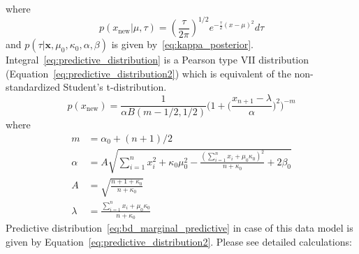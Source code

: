 where
\begin{equation}
p(x_{\text{new}} | \mu, \tau) = (\frac{\tau}{2 \pi})^{1/2} e^{-\frac{\tau}{2} (x-\mu)^2} d \tau
\end{equation}
and $p(\tau | \pmb{x}, \mu_0, \kappa_0, \alpha, \beta)$ is given by~\ref{eq:kappa_posterior}.
Integral~\ref{eq:predictive_distribution} is a Pearson type VII distribution (Equation~\ref{eq:predictive_distribution2}) which is
equivalent of the non-standardized Student's t-distribution.
\begin{equation}
p(x_{\text{new}})=\frac{1}{\alpha B(m - 1/2,1/2)} \Big (  1 + \Big (\frac{x_{n+1} - \lambda}{\alpha} \Big )^2 \Big )^{-m}
\label{eq:predictive_distribution2}
\end{equation}
where
\begin{align}
    m &= \alpha_0 + (n+1)/2\\
    \alpha &= A \sqrt{ \sum_{i=1}^{n} x_i^2 + \kappa_0 \mu_0^2 - \frac{( \sum_{i=1}^{n} x_i + \mu_0 \kappa_0 )^2}{n + \kappa_0} + 2 \beta_0 }\\
    A &= \sqrt{\frac{n+1+\kappa_0}{n+\kappa_0}}\\
    \lambda &= \frac{\sum_{i=1}^n x_i + \mu_0 \kappa_0}{n + \kappa_0}
    \label{eq:posteriro_parameters}
\end{align}
Predictive distribution~\ref{eq:bd_marginal_predictive} in case
of this data model is given by Equation~\ref{eq:predictive_distribution2}.
Please see detailed calculations:

